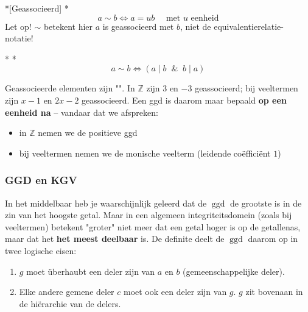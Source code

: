 \begin{nicedefinition}*[Geassocieerd]
    \nextpart[]*
    \begin{equation*}
        a \sim b \iff a = ub \quad \text{ met } u \text{ eenheid}
    \end{equation*}
    Let op! $\sim$ betekent hier $a$ is geassocieerd met $b$, niet de equivalentierelatie-notatie!
\end{nicedefinition}

\begin{nicetheorem}*
    \nextpart[]*
    \begin{equation*}
        a \sim b \iff (a \mid b \;\; \& \;\; b \mid a)
    \end{equation*}
\end{nicetheorem}

\textbf{} Geassocieerde elementen zijn "". In $\mathbb{Z}$ zijn $3$ en $-3$ geassocieerd; bij veeltermen zijn $x-1$ en $2x-2$ geassocieerd. Een ggd is daarom maar bepaald \textbf{op een eenheid na} -- vandaar dat we afspreken:
\begin{itemize}
    \item in $\mathbb{Z}$ nemen we de positieve ggd
    \item bij veeltermen nemen we de monische veelterm (leidende coëfficiënt $1$) 
\end{itemize}

\subsubsection{GGD en KGV}

In het middelbaar heb je waarschijnlijk geleerd dat de $\operatorname{ggd}$ de grootste is in de zin van het hoogste getal. Maar in een algemeen integriteitsdomein (zoals bij veeltermen) betekent "groter" niet meer dat een getal hoger is op de getallenas, maar dat het \textbf{het meest deelbaar} is. De definite deelt de $\operatorname{ggd}$ daarom op in twee logische eisen:
\begin{enumerate}
    \item $g$ moet überhaubt een deler zijn van $a$ en $b$ (gemeenschappelijke deler).
    \item Elke andere gemene deler $c$ moet ook een deler zijn van $g$. $g$ zit bovenaan in de hiërarchie van de delers.
\end{enumerate}

